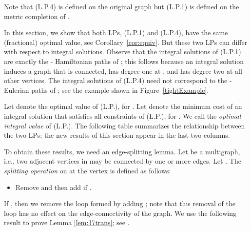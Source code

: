 \documentclass[11pt]{article}
\begin{document}
\medskip

Note that (L.P.4) is defined on the original graph  but (L.P.1)
is defined on the metric completion  of .


In this section, we show that both LPs, (L.P.1) and (L.P.4), have
the same (fractional) optimal value, see Corollary~\ref{cor:equiv}.
But these two LPs can differ with respect to integral solutions.
Observe that the integral solutions of (L.P.1) are
exactly the - Hamiltonian paths of ;
this follows because an integral solution induces a graph
that is connected, has degree one at , and has
degree two at all other vertices.
The integral solutions of (L.P.4) need not correspond to
the - Eulerian paths of ; see the example shown
in Figure~\ref{tightExample}.

Let  denote the optimal value  of (L.P.), for .
Let  denote the minimum cost of
an integral solution that satisfies all constraints of (L.P.),
for .
We call  the \emph{optimal integral value} of (L.P.).
The following table summarizes the relationship between the two LPs;
the new results of this section appear in the last two columns.


\begin{center}
\setlength{\tabcolsep}{1pt}
\end{center}


To obtain these results, we need an edge-splitting lemma.
Let  be a multigraph, i.e., two adjacent vertices in  may be
connected by one or more edges.
Let . The \emph{splitting operation} on
 at the vertex  is defined as follows:

\begin{itemize}
\item Remove  and then add  if .
\end{itemize}

If , then we remove the loop formed by adding ; note that
this removal of the loop has no effect on the edge-connectivity of the graph. We use the following
result to prove Lemma \ref{lem:17trans}; see \cite[Theorem ]{Frank92}.
\end{document}
